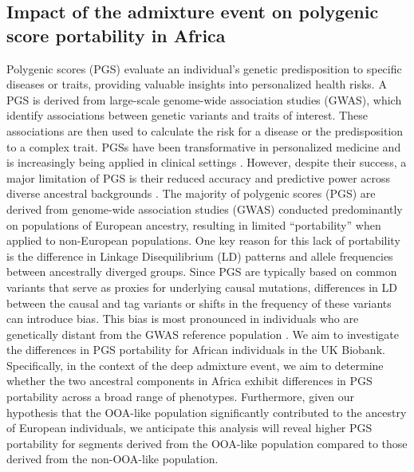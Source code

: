 \clearpage

\subsection{Impact of the admixture event on polygenic score portability in Africa}

Polygenic scores (PGS) evaluate an individual's genetic predisposition to specific diseases or traits, providing valuable insights into personalized health risks. A PGS is derived from large-scale genome-wide association studies (GWAS), which identify associations between genetic variants and traits of interest. These associations are then used to calculate the risk for a disease or the predisposition to a complex trait. PGSs have been transformative in personalized medicine and is increasingly being applied in clinical settings \cite{torkamani2018personal,lewis2020polygenic}. However, despite their success, a major limitation of PGS is their reduced accuracy and predictive power across diverse ancestral backgrounds \cite{martin2019clinical, ding2023polygenic}. The majority of polygenic scores (PGS) are derived from genome-wide association studies (GWAS) conducted predominantly on populations of European ancestry, resulting in limited ``portability'' when applied to non-European populations. One key reason for this lack of portability is the difference in Linkage Disequilibrium (LD) patterns and allele frequencies between ancestrally diverged groups. Since PGS are typically based on common variants that serve as proxies for underlying causal mutations, differences in LD between the causal and tag variants or shifts in the frequency of these variants can introduce bias. This bias is most pronounced in individuals who are genetically distant from the GWAS reference population \cite{ding2023polygenic}. We aim to investigate the differences in PGS portability for African individuals in the UK Biobank. Specifically, in the context of the deep admixture event, we aim to determine whether the two ancestral components in Africa exhibit differences in PGS portability across a broad range of phenotypes. Furthermore, given our hypothesis that the OOA-like population significantly contributed to the ancestry of European individuals, we anticipate this analysis will reveal higher PGS portability for segments derived from the OOA-like population compared to those derived from the non-OOA-like population.

